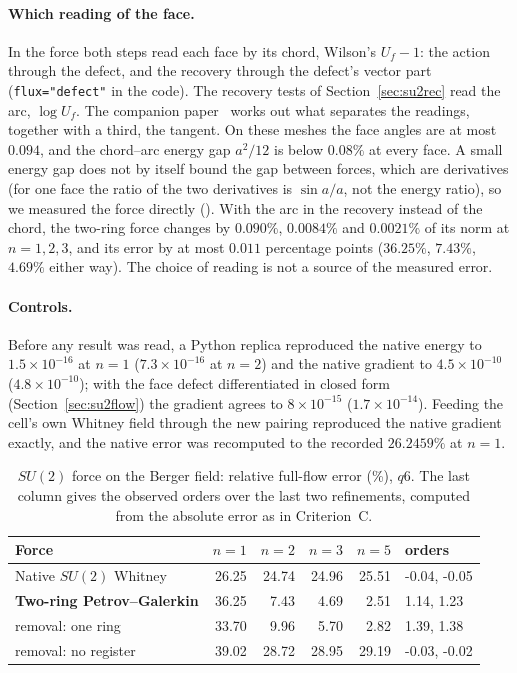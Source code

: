 \documentclass[11pt]{article}
\theoremstyle{definition}
\theoremstyle{remark}
\newcommand{\BW}{Criterion~C}
\begin{document}
\paragraph{Which reading of the face.} In the force both steps read each face by its chord,
Wilson's $U_f-1$: the action through the defect, and the recovery through the defect's vector
part (\texttt{flux="defect"} in the code). The recovery tests of Section~\ref{sec:su2rec} read
the arc, $\log U_f$. The companion paper~\cite{threeways} works out what separates the readings,
together with a third, the tangent. On these meshes the face angles are at most $0.094$, and the
chord--arc energy gap $a^2/12$ is below $0.08\%$ at every face. A small energy gap does not by
itself bound the gap between forces, which are derivatives (for one face the ratio of the two
derivatives is $\sin a/a$, not the energy ratio), so we measured the force directly
(). With the arc in the recovery instead of the
chord, the two-ring force changes by $0.090\%$, $0.0084\%$ and $0.0021\%$ of its norm at
$n=1,2,3$, and its error by at most $0.011$ percentage points ($36.25\%$, $7.43\%$, $4.69\%$
either way). The choice of reading is not a source of the measured error.

\paragraph{Controls.} Before any result was read, a Python replica reproduced the native
energy to $1.5\times10^{-16}$ at $n=1$ ($7.3\times10^{-16}$ at $n=2$) and the native
gradient to $4.5\times10^{-10}$ ($4.8\times10^{-10}$); with the face defect differentiated in
closed form (Section~\ref{sec:su2flow}) the gradient agrees to $8\times10^{-15}$
($1.7\times10^{-14}$). Feeding the cell's
own Whitney field through the new pairing reproduced the native gradient exactly, and the
native error was recomputed to the recorded $26.2459\%$ at $n=1$.

\begin{table}[t]\centering\small
\caption{$SU(2)$ force on the Berger field: relative full-flow error (\%), $q6$. The last
column gives the observed orders over the last two refinements, computed from the absolute
error as in \BW{}.}
\label{tab:su2force}
\begin{tabular}{lrrrrl}\toprule
Force & $n=1$ & $n=2$ & $n=3$ & $n=5$ & orders \\ \midrule
Native $SU(2)$ Whitney & 26.25 & 24.74 & 24.96 & 25.51 & -0.04, -0.05 \\
\textbf{Two-ring Petrov--Galerkin} & 36.25 & 7.43 & 4.69 & 2.51 & 1.14, 1.23 \\
removal: one ring & 33.70 & 9.96 & 5.70 & 2.82 & 1.39, 1.38 \\
removal: no register & 39.02 & 28.72 & 28.95 & 29.19 & -0.03, -0.02 \\
\bottomrule\end{tabular}
\end{table}
\end{document}
